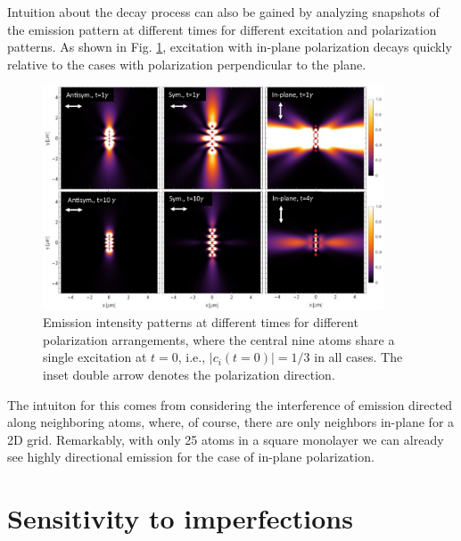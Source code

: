 Intuition about the decay process can also be gained by analyzing snapshots of the emission pattern at different times for different excitation and polarization patterns. As shown in Fig. \ref{fig:collective_emission_patterns}, excitation with in-plane polarization decays quickly relative to the cases with polarization perpendicular to the plane. 
\begin{figure}[!ht]
    \centering
    \includegraphics[width=0.9\textwidth]{Images/collective_emission_patterns.pdf}
    \caption{Emission intensity patterns at different times for different polarization arrangements, where the central nine atoms share a single excitation at $t=0$, i.e., $|c_i(t=0)|=1/3$ in all cases. The inset double arrow denotes the polarization direction.}
    \label{fig:collective_emission_patterns}
\end{figure}
The intuiton for this comes from considering the interference of emission directed along neighboring atoms, where, of course, there are only neighbors in-plane for a 2D grid. Remarkably, with only 25 atoms in a square monolayer we can already see highly directional emission for the case of in-plane polarization.

\section{Sensitivity to imperfections}

